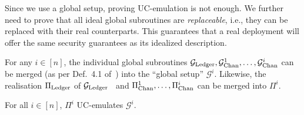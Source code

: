 %

Since we use a global setup, proving UC-emulation is not enough. We further
need to prove that all ideal global subroutines are \emph{replaceable}, i.e.,
they can be replaced with their real counterparts. This guarantees that a real
deployment will offer the same security guarantees as its idealized description.

For any $i \in [n]$, the individual global subroutines $\mathcal{G}_{\mathrm{Ledger}}, \mathcal{G}_{\mathrm{Chan}}^{1},
\dots, \mathcal{G}_{\mathrm{Chan}}^{i}$ can be merged (as per Def.~4.1
of~\cite{10.1007/978-3-030-90453-1_22}) into the ``global setup''
$\mathcal{G}^i$. Likewise, the realisation $\Pi_{\mathrm{Ledger}}$ of $\mathcal{G}_{\mathrm{Ledger}}$~\cite{BMTZ17}
and $\Pi_{\mathrm{Chan}}^{1}, \dots, \Pi_{\mathrm{Chan}}^{i}$ can be merged into $\Pi^i$.

\begin{lemma}
\label{lemma:merged-emulate}
For all $i \in [n]$, $\Pi^i$ UC-emulates $\mathcal{G}^i$.
\end{lemma}

